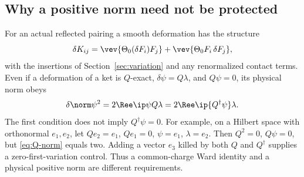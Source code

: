 \subsection{Why a positive norm need not be protected}

For an actual reflected pairing a smooth deformation has the structure
\begin{equation}
 \delta K_{ij}=\vev{\Theta_0(\delta F_i)F_j}
                 +\vev{\Theta_0F_i\,\delta F_j},
\end{equation}
with the insertions of Section~\ref{sec:variation} and any renormalized
contact terms. Even if a deformation of a ket is $Q$-exact,
$\delta\psi=Q\lambda$, and $Q\psi=0$, its physical norm obeys
\begin{equation}\label{eq:Q-norm}
 \delta\norm\psi^2=2\Ree\ip\psi{Q\lambda}
                  =2\Ree\ip{Q^\dagger\psi}\lambda.
\end{equation}
The first condition does not imply $Q^\dagger\psi=0$. For example,
on a Hilbert space with orthonormal $e_1,e_2$, let
$Qe_2=e_1$, $Qe_1=0$, $\psi=e_1$, $\lambda=e_2$.
Then $Q^2=0$, $Q\psi=0$, but \eqref{eq:Q-norm} equals two.
Adding a vector $e_3$ killed by both $Q$ and $Q^\dagger$ supplies a
zero-first-variation control. Thus a common-charge Ward identity
and a physical positive norm are different requirements.
